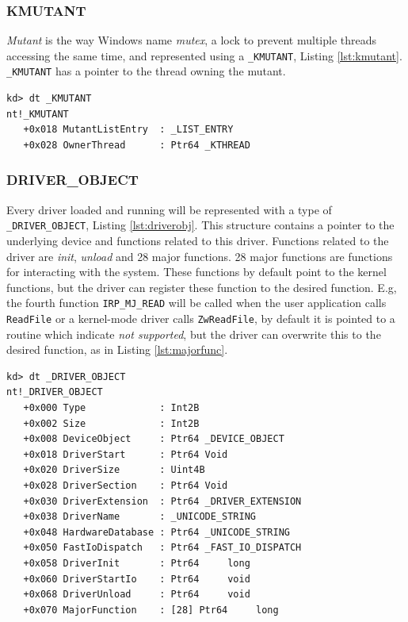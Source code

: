 \subsubsection[KMUTANT]{KMUTANT}

\textit{Mutant} is the way Windows name \textit{mutex}, a lock to prevent
multiple threads accessing the same time, and represented using a
\texttt{\_KMUTANT}, Listing \ref{lst:kmutant}.  \texttt{\_KMUTANT} has a
pointer to the thread owning the mutant.

\begin{lstlisting}[language=windbg,label={lst:kmutant},caption=\texttt{\_KMUTANT} in Windows 7,float,floatplacement=H]
kd> dt _KMUTANT
nt!_KMUTANT
   +0x018 MutantListEntry  : _LIST_ENTRY
   +0x028 OwnerThread      : Ptr64 _KTHREAD
\end{lstlisting}

\subsubsection[DRIVER\_OBJECT]{DRIVER\_OBJECT}

Every driver loaded and running will be represented with a type of
\texttt{\_DRIVER\_OBJECT}, Listing \ref{lst:driverobj}.  This structure
contains a pointer to the underlying device and functions related to this
driver. Functions related to the driver are \textit{init}, \textit{unload} and
28 major functions. 28 major functions are functions for interacting with the
system. These functions by default point to the kernel functions, but the
driver can register these function to the desired function. E.g, the fourth
function \texttt{IRP\_MJ\_READ} will be called when the user application calls
\texttt{ReadFile} or a kernel-mode driver calls \texttt{ZwReadFile}, by default
it is pointed to a routine which indicate \textit{not supported}, but the
driver can overwrite this to the desired function, as in Listing
\ref{lst:majorfunc}.

\begin{lstlisting}[language=windbg,label={lst:driverobj},caption=\texttt{\_DRIVER\_OBJECT} in Windows 7,float,floatplacement=H]
kd> dt _DRIVER_OBJECT
nt!_DRIVER_OBJECT
   +0x000 Type             : Int2B
   +0x002 Size             : Int2B
   +0x008 DeviceObject     : Ptr64 _DEVICE_OBJECT
   +0x018 DriverStart      : Ptr64 Void
   +0x020 DriverSize       : Uint4B
   +0x028 DriverSection    : Ptr64 Void
   +0x030 DriverExtension  : Ptr64 _DRIVER_EXTENSION
   +0x038 DriverName       : _UNICODE_STRING
   +0x048 HardwareDatabase : Ptr64 _UNICODE_STRING
   +0x050 FastIoDispatch   : Ptr64 _FAST_IO_DISPATCH
   +0x058 DriverInit       : Ptr64     long
   +0x060 DriverStartIo    : Ptr64     void
   +0x068 DriverUnload     : Ptr64     void
   +0x070 MajorFunction    : [28] Ptr64     long
\end{lstlisting}

